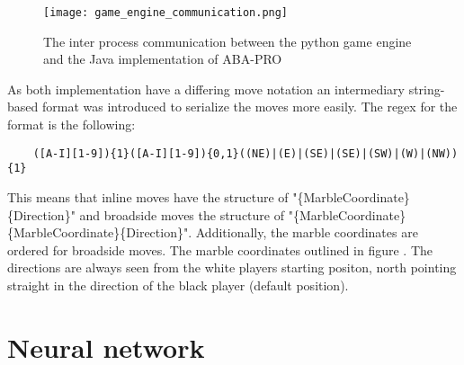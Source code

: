 \begin{figure}
    \centering
    \texttt{[image: game\_engine\_communication.png]}
    \caption{The inter process communication between the python game engine and the Java implementation of ABA-PRO}
    \label{python_java_ipc}
\end{figure}

As both implementation have a differing move notation an intermediary string-based format was introduced to serialize the moves more easily. The regex for the format is the following:

\begin{BVerbatim}
    ([A-I][1-9]){1}([A-I][1-9]){0,1}((NE)|(E)|(SE)|(SE)|(SW)|(W)|(NW)){1}
\end{BVerbatim}

This means that inline moves have the structure of "\{MarbleCoordinate\}\{Direction\}" and broadside moves the structure of "\{MarbleCoordinate\}\{MarbleCoordinate\}\{Direction\}". Additionally, the marble coordinates are ordered for broadside moves. The marble coordinates outlined in figure . The directions are always seen from the white players starting positon, north pointing straight in the direction of the black player (default position).

\section{Neural network}
